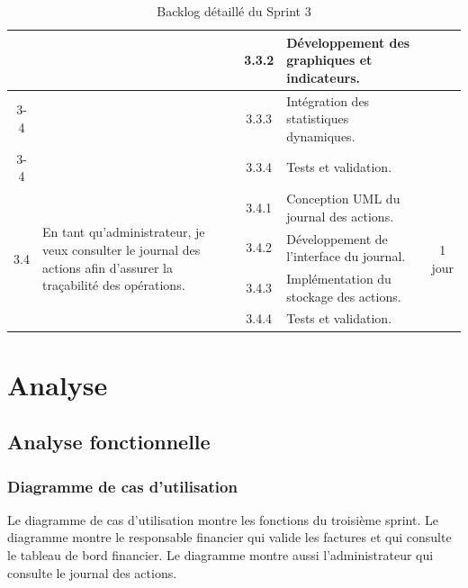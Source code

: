 \begin{table}[H]
\begin{tabularx}{\textwidth}{|c|p{3.6cm}|c|X|c|}
		& & 3.3.2 & Développement des graphiques et indicateurs.
		& \\ \cline{3-4}
		
		& & 3.3.3 & Intégration des statistiques dynamiques.
		& \\ \cline{3-4}
		
		& & 3.3.4 & Tests et validation.
		& \\ \hline
		
		\multirow{4}{*}{3.4}
		& \multirow{4}{3.6cm}{
			En tant qu’administrateur, je veux consulter le journal des actions afin d’assurer la traçabilité des opérations.
		}
		& 3.4.1 & Conception UML du journal des actions. & \multirow{4}{*}{1 jour}
		\\ \cline{3-4}
		
		& & 3.4.2 & Développement de l’interface du journal.
		& \\ \cline{3-4}
		
		& & 3.4.3 & Implémentation du stockage des actions.
		& \\ \cline{3-4}
		
		& & 3.4.4 & Tests et validation.
		& \\ \hline
		
	\end{tabularx}
	
	\caption{Backlog détaillé du Sprint 3}
	\label{tab:backlog_sprint3}
	
\end{table}

\FloatBarrier



\section{Analyse}

\subsection{Analyse fonctionnelle}

\subsubsection{Diagramme de cas d’utilisation}

Le diagramme de cas d’utilisation montre les fonctions du troisième sprint. Le diagramme montre le responsable financier qui valide les factures et qui consulte le tableau de bord financier. Le diagramme montre aussi l’administrateur qui consulte le journal des actions.

